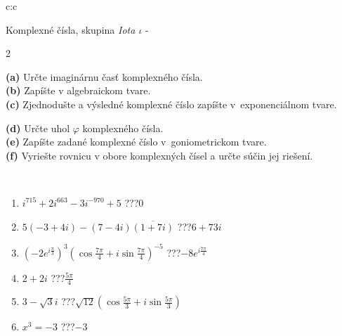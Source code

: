 \documentclass[10pt]{report}
\begin{document}
\begin{tabular}{c:c}
\begin{minipage}[c][104.5mm][t]{0.5\linewidth}
\begin{center}
\vspace{7mm}
{\huge Komplexné čísla, skupina \textit{Iota $\iota$} -}\\[5mm]
\begin{minipage}{0.95\linewidth}
\begin{center}
{\small \begin{multicols}{2} \raggedright
\textbf{(a)} Určte imaginárnu časť komplexného čísla. \\[1mm]
\textbf{(b)} Zapíšte v algebraickom tvare. \\[1mm]
\textbf{(c)} Zjednodušte a výsledné komplexné číslo zapíšte v~exponenciálnom tvare. \par \columnbreak
\textbf{(d)} Určte uhol \(\varphi\) komplexného čísla. \\[1mm]
\textbf{(e)} Zapíšte zadané komplexné číslo v~goniometrickom tvare. \\[1mm]
\textbf{(f)} Vyriešte rovnicu v obore komplexných čísel a určte súčin jej riešení.
\end{multicols}
}
\end{center}
\end{minipage}
\\[4mm]
\begin{minipage}{0.79\linewidth}
\begin{center}
\begin{varwidth}{\linewidth}
\begin{enumerate}
\large
\item $i^{715}+2i^{663}-3i^{-970}+5$\quad \dotfill\; ???\;\dotfill \quad $0$
\item $5(-3+4i)-(7-4i)\overline{(1+7i)}$\quad \dotfill\; ???\;\dotfill \quad $6+73i$
\item $\left(-2e^{i\frac{\pi}{3}}\right)^{3}\left(\cos{\frac{7\pi}{4}}+i\sin{\frac{7\pi}{4}}\right)^{-5}$\quad \dotfill\; ???\;\dotfill \quad $-8e^{i\frac{7\pi}{4}}$
\item $2+2i$\quad \dotfill\; ???\;\dotfill \quad $\frac{5\pi}{4}$
\item $3-\sqrt{3}i$\quad \dotfill\; ???\;\dotfill \quad $\sqrt{12}\left(\cos{\frac{5\pi}{3}}+i\sin{\frac{5\pi}{3}}\right)$
\item $x^3=-3$\quad \dotfill\; ???\;\dotfill \quad $-3$
\end{enumerate}
\end{varwidth}

\end{center}
\end{minipage}
\end{center}
\end{minipage}
\end{tabular}
\end{document}
